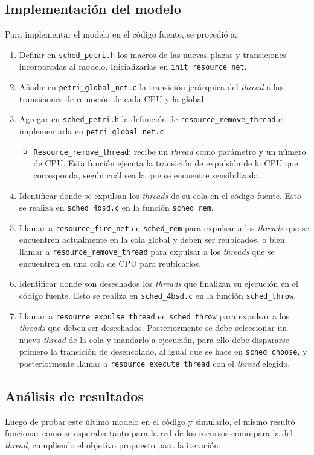 \documentclass[a4paper]{book}
\begin{document}
\subsection{Implementaci\'on del modelo}
Para implementar el modelo en el c\'odigo fuente, se procedi\'o a:
\begin{enumerate}
\item Definir en \verb|sched_petri.h| los macros de las nuevas plazas y transiciones incorporadas al modelo. Inicializarlas en \verb|init_resource_net|.
\item A\~nadir en \verb|petri_global_net.c| la transici\'on jer\'arquica del \emph{thread} a las transiciones de remoci\'on de cada CPU y la global.
\item Agregar en \verb|sched_petri.h| la definici\'on de \verb|resource_remove_thread| e implementarla en \verb|petri_global_net.c|:
\begin{itemize}
\item \verb|Resource_remove_thread|: recibe un \emph{thread} como par\'ametro y un n\'umero de CPU. Esta funci\'on ejecuta la transici\'on de expulsi\'on de la CPU que corresponda, seg\'un cu\'al sea la que se encuentre sensibilizada.
\end{itemize}
\item Identificar donde se expulsan los \emph{threads} de su cola en el c\'odigo fuente. Esto se realiza en \verb|sched_4bsd.c| en la funci\'on \verb|sched_rem|.
\item Llamar a \verb|resource_fire_net| en \verb|sched_rem| para expulsar a los \emph{threads} que se encuentren actualmente en la cola global y deben ser reubicados, o bien llamar a \verb|resource_remove_thread| para expulsar a los \emph{threads} que se encuentren en una cola de CPU para reubicarlos.
\item Identificar donde son desechados los \emph{threads} que finalizan su ejecuci\'on en el c\'odigo fuente. Esto se realiza en \verb|sched_4bsd.c| en la funci\'on \verb|sched_throw|.
\item Llamar a \verb|resource_expulse_thread| en \verb|sched_throw| para expulsar a los \emph{threads} que deben ser desechados. Posteriormente se debe seleccionar un nuevo \emph{thread} de la cola y mandarlo a ejecuci\'on, para ello debe dispararse primero la transici\'on de desencolado, al igual que se hace en \verb|sched_choose|, y posteriormente llamar a \verb|resource_execute_thread| con el \emph{thread} elegido.
\end{enumerate}

\subsection{An\'alisis de resultados}
Luego de probar este \'ultimo modelo en el c\'odigo y simularlo, el mismo result\'o funcionar como se esperaba tanto para la red de los recursos como para la del \emph{thread}, cumpliendo el objetivo propuesto para la iteraci\'on.\\
\end{document}
